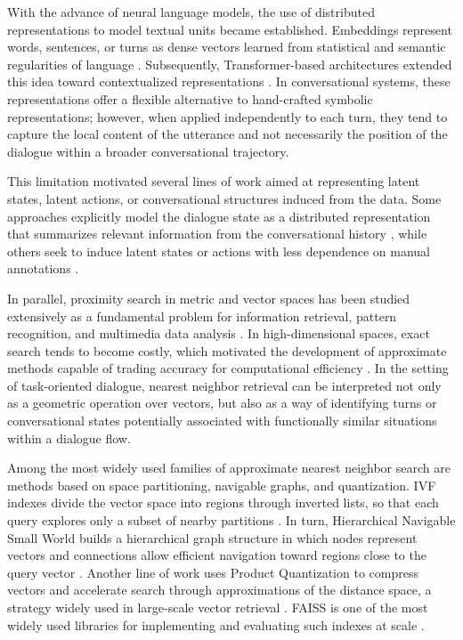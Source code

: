 \documentclass[runningheads]{llncs}
\begin{document}
With the advance of neural language models, the use of distributed representations to model textual units became established. Embeddings represent words, sentences, or turns as dense vectors learned from statistical and semantic regularities of language \cite{bengio2003neural,reimers2019sentencebert}. Subsequently, Transformer-based architectures extended this idea toward contextualized representations \cite{vaswani2017attention,devlin2019bert}. In conversational systems, these representations offer a flexible alternative to hand-crafted symbolic representations; however, when applied independently to each turn, they tend to capture the local content of the utterance and not necessarily the position of the dialogue within a broader conversational trajectory.

This limitation motivated several lines of work aimed at representing latent states, latent actions, or conversational structures induced from the data. Some approaches explicitly model the dialogue state as a distributed representation that summarizes relevant information from the conversational history \cite{wen2018sequence}, while others seek to induce latent states or actions with less dependence on manual annotations \cite{min2020dialogue,hudecek2022latent,liu2023vls}.

In parallel, proximity search in metric and vector spaces has been studied extensively as a fundamental problem for information retrieval, pattern recognition, and multimedia data analysis \cite{chavez2001searching}. In high-dimensional spaces, exact search tends to become costly, which motivated the development of approximate methods capable of trading accuracy for computational efficiency \cite{chavez2005proximity}. In the setting of task-oriented dialogue, nearest neighbor retrieval can be interpreted not only as a geometric operation over vectors, but also as a way of identifying turns or conversational states potentially associated with functionally similar situations within a dialogue flow.

Among the most widely used families of approximate nearest neighbor search are methods based on space partitioning, navigable graphs, and quantization. IVF indexes divide the vector space into regions through inverted lists, so that each query explores only a subset of nearby partitions \cite{sivic2003video,johnson2021billion}. In turn, Hierarchical Navigable Small World builds a hierarchical graph structure in which nodes represent vectors and connections allow efficient navigation toward regions close to the query vector \cite{malkov2020hnsw}. Another line of work uses Product Quantization to compress vectors and accelerate search through approximations of the distance space, a strategy widely used in large-scale vector retrieval \cite{jegou2011pq,johnson2021billion}. FAISS is one of the most widely used libraries for implementing and evaluating such indexes at scale \cite{johnson2021billion}.
\end{document}
